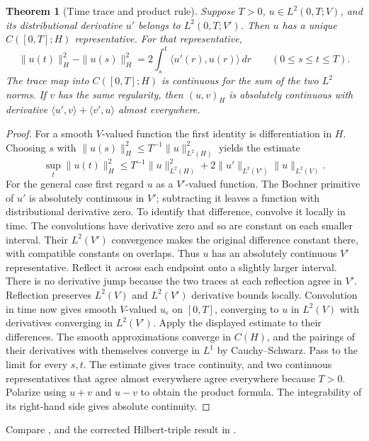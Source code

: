 \documentclass[11pt,oneside,openany]{book}
\theoremstyle{plain}
\newtheorem{theorem}{Theorem}[chapter]
\theoremstyle{definition}
\theoremstyle{remark}
\begin{document}
\begin{theorem}[Time trace and product rule]
\label{thm:pde-time-trace}
Suppose \(T>0\), \(u\in L^2(0,T;V)\), and its distributional
derivative \(u'\) belongs to \(L^2(0,T;V')\).
Then \(u\) has a unique \(C([0,T];H)\) representative. For that
representative,
\[
 \|u(t)\|_H^2-\|u(s)\|_H^2
       =2\int_s^t\langle u'(r),u(r)\rangle\,dr
       \qquad(0\le s\le t\le T).
\]
The trace map into \(C([0,T];H)\) is continuous for the sum of the
two \(L^2\) norms. If \(v\) has the same regularity, then
\((u,v)_H\) is absolutely continuous with derivative
\(\langle u',v\rangle+\langle v',u\rangle\) almost everywhere.
\end{theorem}
\begin{proof}
For a smooth \(V\)-valued function the first identity is
differentiation in \(H\). Choosing \(s\) with
\(\|u(s)\|_H^2\le T^{-1}\|u\|_{L^2(H)}^2\) yields the estimate
\[
 \sup_t\|u(t)\|_H^2
 \le T^{-1}\|u\|_{L^2(H)}^2+
       2\|u'\|_{L^2(V')}\|u\|_{L^2(V)} .
\]
For the general case first regard \(u\) as a \(V'\)-valued function.
The Bochner primitive of \(u'\) is absolutely continuous in \(V'\);
subtracting it leaves a function with distributional derivative
zero. To identify that difference, convolve it locally in time.
The convolutions have derivative zero and so are constant on
each smaller interval. Their \(L^2(V')\) convergence makes the
original difference constant there, with compatible constants on
overlaps. Thus \(u\) has an absolutely continuous \(V'\) representative.
Reflect it across each endpoint onto a slightly larger interval.
There is no derivative jump because the two traces at each
reflection agree in \(V'\). Reflection preserves \(L^2(V)\)
and \(L^2(V')\) derivative bounds locally. Convolution in time
now gives smooth \(V\)-valued \(u_\epsilon\) on \([0,T]\),
converging to \(u\) in \(L^2(V)\) with derivatives converging
in \(L^2(V')\). Apply the displayed estimate to their differences.
The smooth approximations converge in \(C(H)\), and the pairings
of their derivatives with themselves converge in \(L^1\)
by Cauchy--Schwarz. Pass to the limit for every \(s,t\).
The estimate gives trace continuity, and two continuous
representatives that agree almost everywhere agree everywhere
because \(T>0\). Polarize using \(u+v\) and \(u-v\) to obtain
the product formula. The integrability of its right-hand side
gives absolute continuity.
\end{proof}

Compare \cite[Section 5.9.2]{Evans}, \cite[Chapter 11]{RR}
and the corrected Hilbert-triple result in \cite{D16}.
\end{document}
